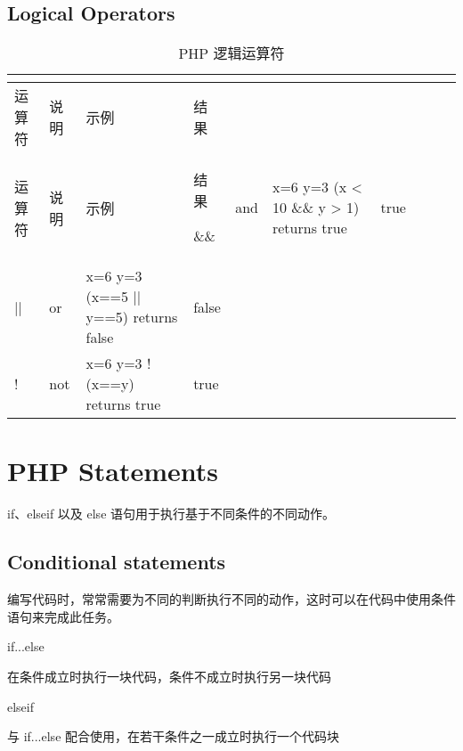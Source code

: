 \section{Logical Operators}



\begin{longtable}{|m{35pt}|m{60pt}|m{200pt}|m{30pt}|}
\tabularnewline\hline
运算符	&说明	&示例	&结果
\endhead

\caption{PHP 逻辑运算符}\\
\hline
运算符	&说明	&示例	&结果
\endfirsthead

\endfoot

\endlastfoot
\hline
\&\&	&and	 				&x=6 \newline y=3 \newline (x < 10 \&\& y > 1) returns true&true\\
\hline
||		&or	 					& x=6 \newline y=3 \newline (x==5 || y==5) returns false&false\\
\hline
!		&not	 				& x=6 \newline y=3 \newline !(x==y) returns true		&true\\
\hline
\end{longtable}





\chapter{PHP Statements}

if、elseif 以及 else 语句用于执行基于不同条件的不同动作。



\section{Conditional statements}

编写代码时，常常需要为不同的判断执行不同的动作，这时可以在代码中使用条件语句来完成此任务。

\begin{compactitem}
\item if...else

在条件成立时执行一块代码，条件不成立时执行另一块代码

\item elseif

与 if...else 配合使用，在若干条件之一成立时执行一个代码块
\end{compactitem}



